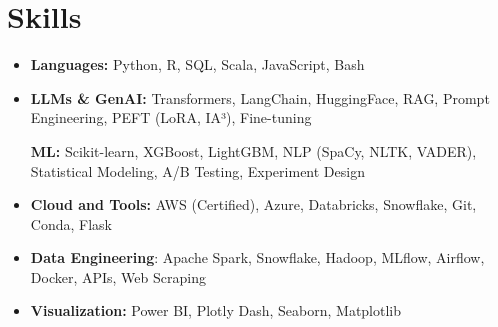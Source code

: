 \documentclass[letterpaper,11pt]{article}
\begin{document}

\vspace{-9pt}
\section{\large{Skills}}
\vspace{1pt}

\begin{itemize}[leftmargin=0.00in, label={}, itemsep=0pt, parsep=0pt]
\item{
\small{\textbf{Languages:} Python, R, SQL, Scala, JavaScript, Bash}
}





\item{
\small{\textbf{LLMs \& GenAI:} Transformers, LangChain, HuggingFace, RAG, Prompt Engineering, PEFT (LoRA, IA³), Fine-tuning}}

\small{\textbf{ML:} Scikit-learn, XGBoost, LightGBM, NLP (SpaCy, NLTK, VADER), Statistical Modeling, A/B Testing, Experiment Design
}



\item{
\small{\textbf{Cloud and Tools:} AWS (Certified), Azure,  Databricks, Snowflake, Git, Conda, Flask}
}

\item{
\small{\textbf{Data Engineering}: Apache Spark, Snowflake, Hadoop, MLflow, Airflow, Docker, APIs, Web Scraping}
}


\item{
\small{\textbf{Visualization:} Power BI, Plotly Dash, Seaborn, Matplotlib  }
}


\end{itemize}
\end{document}
